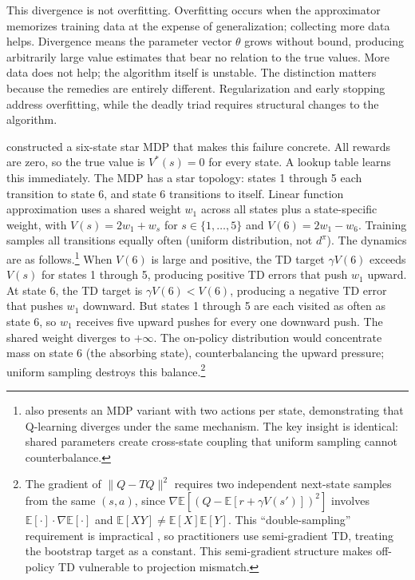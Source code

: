 This divergence is not overfitting. Overfitting occurs when the approximator memorizes training data at the expense of generalization; collecting more data helps. Divergence means the parameter vector $\theta$ grows without bound, producing arbitrarily large value estimates that bear no relation to the true values. More data does not help; the algorithm itself is unstable. The distinction matters because the remedies are entirely different. Regularization and early stopping address overfitting, while the deadly triad requires structural changes to the algorithm.

\citet{Baird1995} constructed a six-state star MDP that makes this failure concrete. All rewards are zero, so the true value is $V^*(s) = 0$ for every state. A lookup table learns this immediately. The MDP has a star topology: states 1 through 5 each transition to state 6, and state 6 transitions to itself. Linear function approximation uses a shared weight $w_1$ across all states plus a state-specific weight, with $V(s) = 2w_1 + w_s$ for $s \in \{1,\ldots,5\}$ and $V(6) = 2w_1 - w_6$. Training samples all transitions equally often (uniform distribution, not $d^\pi$). The dynamics are as follows.\footnote{\citet{Baird1995} also presents an MDP variant with two actions per state, demonstrating that Q-learning diverges under the same mechanism. The key insight is identical: shared parameters create cross-state coupling that uniform sampling cannot counterbalance.} When $V(6)$ is large and positive, the TD target $\gamma V(6)$ exceeds $V(s)$ for states 1 through 5, producing positive TD errors that push $w_1$ upward. At state 6, the TD target is $\gamma V(6) < V(6)$, producing a negative TD error that pushes $w_1$ downward. But states 1 through 5 are each visited as often as state 6, so $w_1$ receives five upward pushes for every one downward push. The shared weight diverges to $+\infty$. The on-policy distribution would concentrate mass on state 6 (the absorbing state), counterbalancing the upward pressure; uniform sampling destroys this balance.\footnote{The gradient of $\|Q - TQ\|^2$ requires two independent next-state samples from the same $(s,a)$, since $\nabla\mathbb{E}[(Q - \mathbb{E}[r + \gamma V(s')])^2]$ involves $\mathbb{E}[\cdot] \cdot \nabla\mathbb{E}[\cdot]$ and $\mathbb{E}[XY] \neq \mathbb{E}[X]\mathbb{E}[Y]$. This ``double-sampling'' requirement is impractical \citep{Baird1995}, so practitioners use semi-gradient TD, treating the bootstrap target as a constant. This semi-gradient structure makes off-policy TD vulnerable to projection mismatch.}

